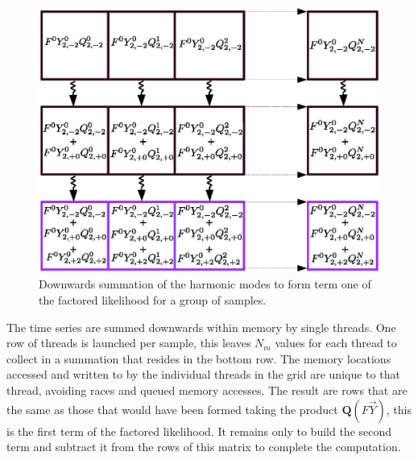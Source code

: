 \clearpage

\begin{figure}
\vspace{-0.78cm}
\begin{center}
\includegraphics[trim={1.67cm, 10cm, 0, 3cm}, clip, scale=0.5]{sumrhots.eps}
\caption{Downwards summation of the harmonic modes to form term one of the factored likelihood for a group of samples.}
\end{center}
\end{figure}

The time series are summed downwards within memory by single threads. One row of threads is launched per sample, this leaves $N_m$ values for each thread to collect in a summation that resides in the bottom row. The memory locations accessed and written to by the individual threads in the grid are unique to that thread, avoiding races and queued memory accesses. The result are rows that are the same as those that would have been formed taking the product $\mathbf{Q}(F\vec{Y})$, this is the first term of the factored likelihood. It remains only to build the second term and subtract it from the rows of this matrix to complete the computation.  

